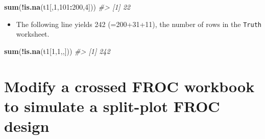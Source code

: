 \documentclass[]{book}
\newenvironment{Shaded}{\begin{snugshade}}{\end{snugshade}}
\newcommand{\CommentTok}[1]{\textcolor[rgb]{0.56,0.35,0.01}{\textit{#1}}}
\newcommand{\DecValTok}[1]{\textcolor[rgb]{0.00,0.00,0.81}{#1}}
\newcommand{\KeywordTok}[1]{\textcolor[rgb]{0.13,0.29,0.53}{\textbf{#1}}}
\newcommand{\NormalTok}[1]{#1}
\newcommand{\OperatorTok}[1]{\textcolor[rgb]{0.81,0.36,0.00}{\textbf{#1}}}
\providecommand{\tightlist}{%
  \setlength{\itemsep}{0pt}\setlength{\parskip}{0pt}}
\begin{document}
\begin{Shaded}
\begin{Highlighting}[]
\KeywordTok{sum}\NormalTok{(}\OperatorTok{!}\KeywordTok{is.na}\NormalTok{(t1[,}\DecValTok{1}\NormalTok{,}\DecValTok{101}\OperatorTok{:}\DecValTok{200}\NormalTok{,}\DecValTok{4}\NormalTok{]))}
\CommentTok{#> [1] 22}
\end{Highlighting}
\end{Shaded}

\begin{itemize}
\tightlist
\item
  The following line yields 242 (=200+31+11), the number of rows in the \texttt{Truth} worksheet.
\end{itemize}

\begin{Shaded}
\begin{Highlighting}[]
\KeywordTok{sum}\NormalTok{(}\OperatorTok{!}\KeywordTok{is.na}\NormalTok{(t1[}\DecValTok{1}\NormalTok{,}\DecValTok{1}\NormalTok{,,]))}
\CommentTok{#> [1] 242}
\end{Highlighting}
\end{Shaded}

\hypertarget{modify-a-crossed-froc-workbook-to-simulate-a-split-plot-froc-design}{%
\section{Modify a crossed FROC workbook to simulate a split-plot FROC design}\label{modify-a-crossed-froc-workbook-to-simulate-a-split-plot-froc-design}}
\end{document}
